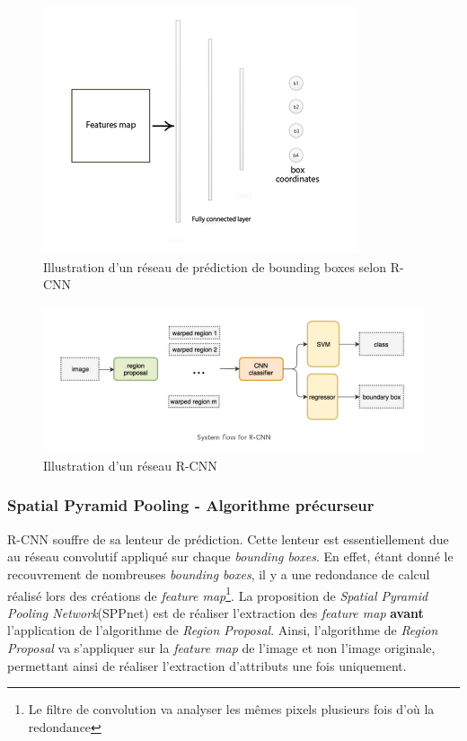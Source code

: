 \begin{figure}
    \centering
    \includegraphics[scale=0.4]{./tex/computer-vision/sota/rcnn2.png}
    \caption{Illustration d'un réseau de prédiction de bounding boxes selon R-CNN}
    \label{rcnn2}
\end{figure}

\begin{figure}
    \centering
    \includegraphics[scale=0.4]{./tex/computer-vision/sota/rcnn1.png}
    \caption{Illustration d'un réseau R-CNN}
    \label{rcnn1}
\end{figure}

\subsubsection{Spatial Pyramid Pooling - Algorithme précurseur}
R-CNN souffre de sa lenteur de prédiction. Cette lenteur est essentiellement due au réseau convolutif appliqué sur chaque \textit{bounding boxes}. En effet, étant donné le recouvrement de nombreuses \textit{bounding boxes}, il y a une redondance de calcul réalisé lors des créations de \textit{feature map}\footnote{Le filtre de convolution va analyser les mêmes pixels plusieurs fois d'où la redondance}. La proposition de \textit{Spatial Pyramid Pooling Network}\cite{sppnet}(SPPnet) est de réaliser l'extraction des \textit{feature map} \textbf{avant} l'application de l'algorithme de \textit{Region Proposal}. Ainsi, l'algorithme de \textit{Region Proposal} va s'appliquer sur la \textit{feature map} de l'image et non l'image originale, permettant ainsi de réaliser l'extraction d'attributs une fois uniquement.\\


